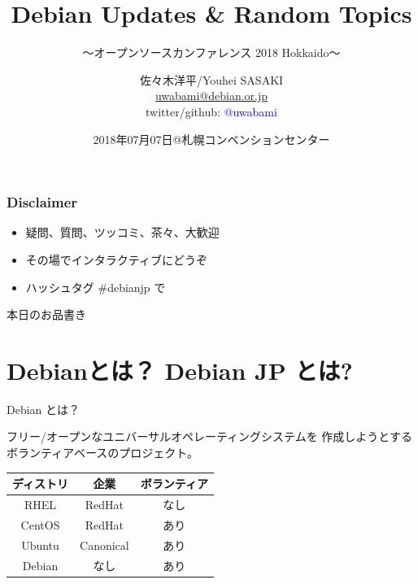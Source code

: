 \documentclass[cjk,c,squeeze,shrink,dvipdfmx,12pt]{beamer}
\title[Debian Updates \& Random Topics]{Debian Updates \& Random Topics}
\subtitle[OSC 2018 Hokkaido]{〜オープンソースカンファレンス 2018 Hokkaido〜}
\author[佐々木]{%
  佐々木洋平/Youhei SASAKI\\[1em]
  \href{mailto:uwabami@debian.or.jp}{uwabami@debian.or.jp}\\
  twitter/github: \textcolor{blue}{@uwabami}
}
\institute[Debian JP Project]{%
  {\footnotesize{%
      Debian JP Project/東京エリアDebian勉強会/関西Debian勉強会
    }}
}
\date[2018/07/07]{%
  {\tiny{2018年07月07日@札幌コンベンションセンター}}
}
\begin{document}
\takahashi[80]{　}
{%
  \begin{frame}
    \maketitle
  \end{frame}
}


\begin{frame}[fragile]
  \frametitle{Disclaimer}
  \begin{itemize}
  \item 疑問、質問、ツッコミ、茶々、\alert{大歓迎}
  \item その場でインタラクティブにどうぞ
  \item ハッシュタグ \alert{\#debianjp} で
  \end{itemize}
\end{frame}


\begin{frame}[fragile]{本日のお品書き}
  \tableofcontents
\end{frame}

\section{Debianとは？ Debian JP とは?}

\begin{frame}[fragile]{Debian とは？}

  \alert{フリー/オープン}な\alert{ユニバーサル}オペレーティングシステムを
  作成しようとするボランティアベースのプロジェクト。

  \vfill
  \centering
  \begin{tabular}{|c|c|c|}
    \hline
    ディストリ & 企業 & ボランティア \\ \hline
    RHEL & RedHat & なし  \\ \hline
    CentOS & RedHat & あり \\ \hline
    Ubuntu  & Canonical & あり \\ \hline
    \alert{Debian}  & \alert{なし} & \alert{あり} \\ \hline
  \end{tabular}
  \vfill
\end{frame}
\end{document}
